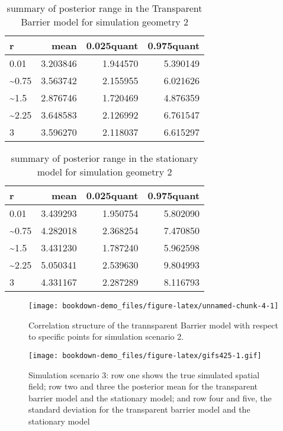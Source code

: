 \documentclass[
]{book}
\begin{document}
\begin{table}

\caption{\label{tab:unnamed-chunk-2}summary of posterior range in the Transparent Barrier model for simulation geometry 2}
\centering
\begin{tabular}[t]{l|r|r|r}
\hline
r & mean & 0.025quant & 0.975quant\\
\hline
0.01 & 3.203846 & 1.944570 & 5.390149\\
\hline
\textasciitilde{}0.75 & 3.563742 & 2.155955 & 6.021626\\
\hline
\textasciitilde{}1.5 & 2.876746 & 1.720469 & 4.876359\\
\hline
\textasciitilde{}2.25 & 3.648583 & 2.126992 & 6.761547\\
\hline
3 & 3.596270 & 2.118037 & 6.615297\\
\hline
\end{tabular}
\end{table}

\begin{table}

\caption{\label{tab:unnamed-chunk-3}summary of posterior range in the stationary model for simulation geometry 2}
\centering
\begin{tabular}[t]{l|r|r|r}
\hline
r & mean & 0.025quant & 0.975quant\\
\hline
0.01 & 3.439293 & 1.950754 & 5.802090\\
\hline
\textasciitilde{}0.75 & 4.282018 & 2.368254 & 7.470850\\
\hline
\textasciitilde{}1.5 & 3.431230 & 1.787240 & 5.962598\\
\hline
\textasciitilde{}2.25 & 5.050341 & 2.539630 & 9.804993\\
\hline
3 & 4.331167 & 2.287289 & 8.116793\\
\hline
\end{tabular}
\end{table}

\begin{figure}
\texttt{[image: bookdown-demo\_files/figure-latex/unnamed-chunk-4-1]} \caption{Correlation structure of the trannsparent Barrier model with respect to specific points for simulation scenario 2.}\label{fig:unnamed-chunk-4}
\end{figure}

\begin{figure}
\centering
\texttt{[image: bookdown-demo\_files/figure-latex/gifs425-1.gif]}
\caption{\label{fig:gifs425}Simulation scenario 3: row one shows the true simulated spatial field; row two and three the posterior mean for the transparent barrier model and the stationary model; and row four and five, the standard deviation for the transparent barrier model and the stationary model}
\end{figure}
\end{document}
